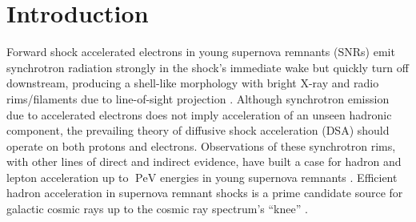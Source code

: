 \documentclass[iop, apj, numberedappendix]{emulateapj}
\newcommand*{\mt}{\mathrm}
\newcommand*{\unit}[1]{\;\mt{#1}}  %
\begin{document}


\section{Introduction} \label{sec:intro}

Forward shock accelerated electrons in young supernova remnants (SNRs) emit
synchrotron radiation strongly in the shock's immediate wake but quickly turn
off downstream, producing a shell-like morphology with bright X-ray and radio
rims/filaments due to line-of-sight projection \citep{koyama1995}.  Although
synchrotron emission due to accelerated electrons does not imply acceleration
of an unseen hadronic component, the prevailing theory of diffusive shock
acceleration (DSA) should operate on both protons and electrons.  Observations
of these synchrotron rims, with other lines of direct and indirect evidence,
have built a case for hadron and lepton acceleration up to $\unit{PeV}$
energies in young supernova remnants \citep{uchiyama2007, aharonian2004,
acero2010, ackermann2013}.  Efficient hadron acceleration in supernova remnant
shocks is a prime candidate source for galactic cosmic rays up to the
cosmic ray spectrum's ``knee'' \citep{vink2012}.
\end{document}
